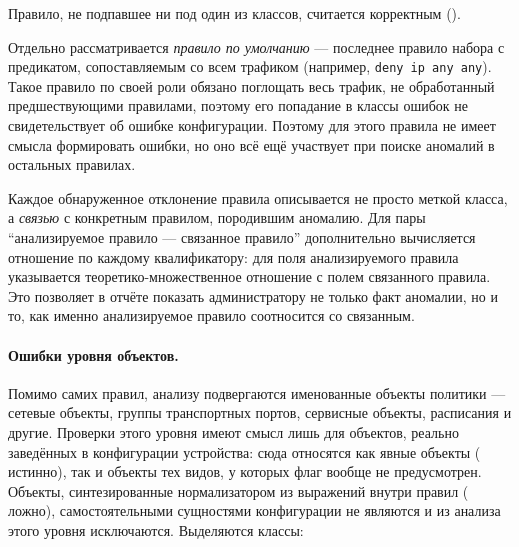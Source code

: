 Правило, не подпавшее ни под один из классов, считается корректным ().

Отдельно рассматривается \emph{правило по умолчанию} --- последнее правило набора с предикатом, сопоставляемым со всем трафиком (например, \texttt{deny ip any any}). Такое правило по своей роли обязано поглощать весь трафик, не обработанный предшествующими правилами, поэтому его попадание в классы ошибок не свидетельствует об ошибке конфигурации. Поэтому для этого правила не имеет смысла формировать ошибки, но оно всё ещё участвует при поиске аномалий в остальных правилах.

Каждое обнаруженное отклонение правила описывается не просто меткой класса, а \emph{связью} с конкретным правилом, породившим аномалию. Для пары ``анализируемое правило --- связанное правило'' дополнительно вычисляется отношение по каждому квалификатору: для поля анализируемого правила указывается теоретико-множественное отношение с полем связанного правила. Это позволяет в отчёте показать администратору не только факт аномалии, но и то, как именно анализируемое правило соотносится со связанным.

\paragraph{Ошибки уровня объектов.} Помимо самих правил, анализу подвергаются именованные объекты политики --- сетевые объекты, группы транспортных портов, сервисные объекты, расписания и другие. Проверки этого уровня имеют смысл лишь для объектов, реально заведённых в конфигурации устройства: сюда относятся как явные объекты ( истинно), так и объекты тех видов, у которых флаг  вообще не предусмотрен. Объекты, синтезированные нормализатором из выражений внутри правил ( ложно), самостоятельными сущностями конфигурации не являются и из анализа этого уровня исключаются. Выделяются классы:

